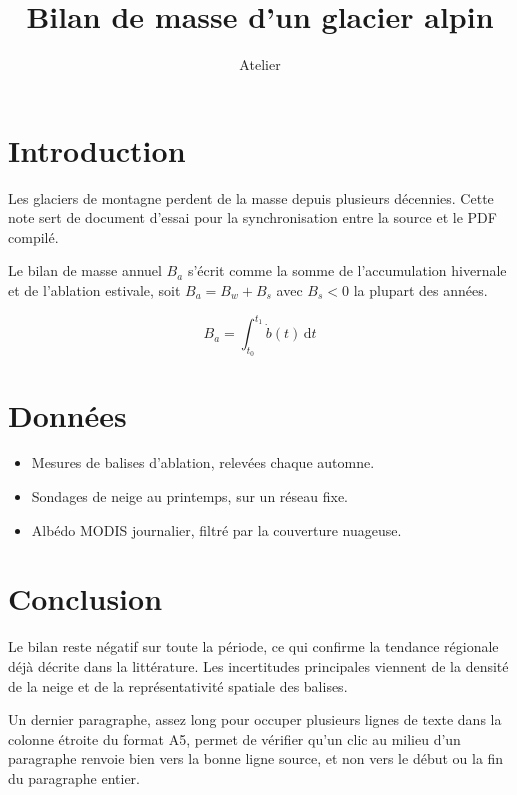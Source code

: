 \documentclass[11pt]{article}
\title{Bilan de masse d'un glacier alpin}
\author{Atelier}
\date{}
\begin{document}
\maketitle

\section{Introduction}
Les glaciers de montagne perdent de la masse depuis plusieurs
d\'ecennies. Cette note sert de document d'essai pour la
synchronisation entre la source et le PDF compil\'e.

Le bilan de masse annuel $B_a$ s'\'ecrit comme la somme de
l'accumulation hivernale et de l'ablation estivale, soit
$B_a = B_w + B_s$ avec $B_s < 0$ la plupart des ann\'ees.


\begin{equation}
  B_a = \int_{t_0}^{t_1} \dot{b}(t)\,\mathrm{d}t
  \label{eq:bilan}
\end{equation}

\section{Donn\'ees}
\begin{itemize}
  \item Mesures de balises d'ablation, relev\'ees chaque automne.
  \item Sondages de neige au printemps, sur un r\'eseau fixe.
  \item Alb\'edo MODIS journalier, filtr\'e par la couverture nuageuse.
\end{itemize}



\section{Conclusion}
Le bilan reste n\'egatif sur toute la p\'eriode, ce qui confirme
la tendance r\'egionale d\'ej\`a d\'ecrite dans la litt\'erature.
Les incertitudes principales viennent de la densit\'e de la neige
et de la repr\'esentativit\'e spatiale des balises.

Un dernier paragraphe, assez long pour occuper plusieurs lignes de
texte dans la colonne \'etroite du format A5, permet de v\'erifier
qu'un clic au milieu d'un paragraphe renvoie bien vers la bonne
ligne source, et non vers le d\'ebut ou la fin du paragraphe entier.
\end{document}
